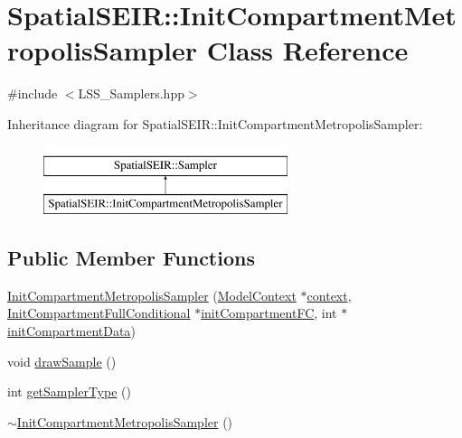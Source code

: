 \hypertarget{classSpatialSEIR_1_1InitCompartmentMetropolisSampler}{\section{Spatial\-S\-E\-I\-R\-:\-:Init\-Compartment\-Metropolis\-Sampler Class Reference}
\label{classSpatialSEIR_1_1InitCompartmentMetropolisSampler}
}


{\ttfamily \#include $<$L\-S\-S\-\_\-\-Samplers.\-hpp$>$}

Inheritance diagram for Spatial\-S\-E\-I\-R\-:\-:Init\-Compartment\-Metropolis\-Sampler\-:\begin{figure}[H]
\begin{center}
\leavevmode
\includegraphics[height=2.000000cm]{classSpatialSEIR_1_1InitCompartmentMetropolisSampler}
\end{center}
\end{figure}
\subsection*{Public Member Functions}
\begin{DoxyCompactItemize}
\item 
\hyperlink{classSpatialSEIR_1_1InitCompartmentMetropolisSampler_a90228456741e4904deb02df3d74f27ed}{Init\-Compartment\-Metropolis\-Sampler} (\hyperlink{classSpatialSEIR_1_1ModelContext}{Model\-Context} $\ast$\hyperlink{classSpatialSEIR_1_1InitCompartmentMetropolisSampler_a3d6e255eb92808635a3b3cf869f136d8}{context}, \hyperlink{classSpatialSEIR_1_1InitCompartmentFullConditional}{Init\-Compartment\-Full\-Conditional} $\ast$\hyperlink{classSpatialSEIR_1_1InitCompartmentMetropolisSampler_af03f0584b11639e8fbe907307ad28aa4}{init\-Compartment\-F\-C}, int $\ast$\hyperlink{classSpatialSEIR_1_1InitCompartmentMetropolisSampler_ade210e4e15fddcfac80ce9c6c263e289}{init\-Compartment\-Data})
\item 
void \hyperlink{classSpatialSEIR_1_1InitCompartmentMetropolisSampler_a24aba18be0f06df089897aa471aa8a86}{draw\-Sample} ()
\item 
int \hyperlink{classSpatialSEIR_1_1InitCompartmentMetropolisSampler_ad64b5ae0943c980f752c49f9c179a3b7}{get\-Sampler\-Type} ()
\item 
\hyperlink{classSpatialSEIR_1_1InitCompartmentMetropolisSampler_ae09e31e0811fc8f531b54490e98a17ee}{$\sim$\-Init\-Compartment\-Metropolis\-Sampler} ()
\end{DoxyCompactItemize}
